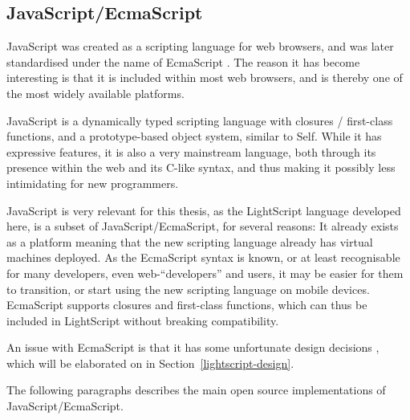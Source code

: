 \documentclass[11pt]{report}
\begin{document}
\subsection{JavaScript/EcmaScript}
\label{JavaScript}
JavaScript was created as a scripting language for web browsers, and was later standardised under the name of EcmaScript \cite{ecma-262}.
The reason it has become interesting is that it is included within most web browsers, and is thereby one of the most widely available platforms.

JavaScript is a dynamically typed scripting language with closures / first-class functions, and a prototype-based object system, similar to Self.
While it has expressive features, it is also a very mainstream language, both through its presence within the web and its C-like syntax, and thus making it possibly less intimidating for new programmers.

JavaScript is very relevant for this thesis, as the LightScript language developed here, is a subset of JavaScript/EcmaScript, for several reasons: 
It already exists as a platform meaning that the new scripting language already has virtual machines deployed. As the EcmaScript syntax is known, or at least recognisable for many developers, even web-``developers'' and users, it may be easier for them to transition, or start using the new scripting language on mobile devices. 
EcmaScript supports closures and first-class functions, which can thus be included in LightScript without breaking compatibility.

An issue with EcmaScript is that it has some unfortunate design decisions \cite{crockford-web}, which will be elaborated on in Section~\ref{lightscript-design}.


The following paragraphs describes the main open source implementations of Java\-Script/EcmaScript.
\end{document}
